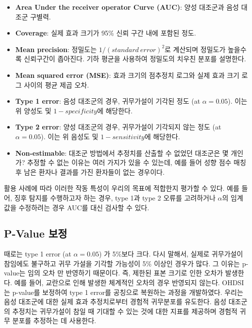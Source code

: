 \documentclass[11pt]{book}
\providecommand{\tightlist}{%
  \setlength{\itemsep}{0pt}\setlength{\parskip}{0pt}}
\theoremstyle{definition}
\theoremstyle{definition}
\theoremstyle{definition}
\theoremstyle{remark}
\begin{document}
\begin{itemize}
\tightlist
\item
  \textbf{Area Under the receiver operator Curve (AUC)}: 양성 대조군과
  음성 대조군 구별력.
\item
  \textbf{Coverage}: 실제 효과 크기가 95\% 신뢰 구간 내에 포함된 정도.
\item
  \textbf{Mean precision}: 정밀도는 \(1 / (standard \ error) ^ 2\)로
  계산되며 정밀도가 높을수록 신뢰구간이 좁아진다. 기하 평균을 사용하여
  정밀도의 치우친 분포를 설명한다.
\item
  \textbf{Mean squared error (MSE)}: 효과 크기의 점추정치 로그와 실제
  효과 크기 로그 사이의 평균 제곱 오차.
\item
  \textbf{Type 1 error}: 음성 대조군의 경우, 귀무가설이 기각된 정도 (at
  \(\alpha = 0.05\)). 이는 위 양성도 및 \(1 - specificity\)에 해당한다.
\item
  \textbf{Type 2 error}: 양성 대조군의 경우, 귀무가설이 기각되지 않는
  정도 (at \(\alpha = 0.05\)). 이는 위 음성도 및 \(1 - sensitivity\)에
  해당한다.
\item
  \textbf{Non-estimable}: 대조군 방법에서 추정치를 산출할 수 없었던
  대조군은 몇 개인가? 추정할 수 없는 이유는 여러 가지가 있을 수 있는데,
  예를 들어 성향 점수 매칭 후 남은 환자나 결과를 가진 환자들이 없는
  경우이다.
\end{itemize}

활용 사례에 따라 이러한 작동 특성이 우리의 목표에 적합한지 평가할 수
있다. 예를 들어, 징후 탐지를 수행하고자 하는 경우, type 1과 type 2
오류를 고려하거나 \(\alpha\)의 임계 값을 수정하려는 경우 AUC를 대신
검사할 수 있다.

\subsection{P-Value 보정}\label{p-value-}

 

때로는 type 1 error (at \(\alpha = 0.05\)) 가 5\%보다 크다. 다시 말해서,
실제로 귀무가설이 참임에도 불구하고 귀무 가설을 기각할 가능성이 5\%
이상인 경우가 많다. 그 이유는 p-value는 임의 오차 만 반영하기 때문이다.
즉, 제한된 표본 크기로 인한 오차가 발생한다. 예를 들어, 교란으로 인해
발생한 체계적인 오차의 경우 반영되지 않는다. OHDSI는 p-value를 보정하여
type 1 error를 공칭으로 복원하는 과정을 개발하였다.
\citep{schuemie_2014} 우리는 음성 대조군에 대한 실제 효과 추정치로부터
경험적 귀무분포를 유도한다. 음성 대조군의 추정치는 귀무가설이 참일 때
기대할 수 있는 것에 대한 지표를 제공하며 경험적 귀무 분포를 추정하는 데
사용한다.
\end{document}
